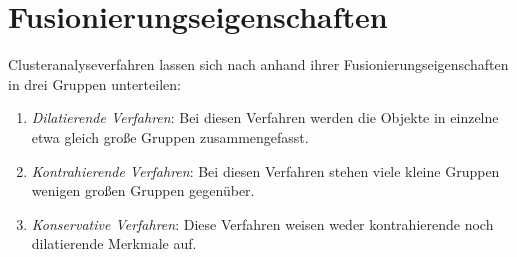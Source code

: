 \section{Fusionierungseigenschaften}
Clusteranalyseverfahren lassen sich nach \citet[S. 488/489]{Backhaus.2016} anhand ihrer Fusionierungseigenschaften in drei Gruppen unterteilen:
\begin{enumerate}
        \item \textit{Dilatierende Verfahren}: Bei diesen Verfahren werden die Objekte in einzelne etwa gleich große Gruppen zusammengefasst.
        \item \textit{Kontrahierende Verfahren}: Bei diesen Verfahren stehen viele kleine Gruppen wenigen großen Gruppen gegenüber.
        \item \textit{Konservative Verfahren}: Diese Verfahren weisen weder kontrahierende noch dilatierende Merkmale auf.
\end{enumerate}
